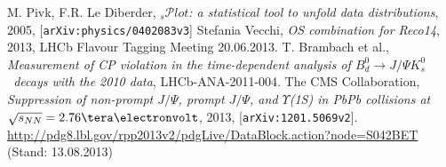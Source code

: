 \documentclass[ a4paper,
                12pt, 
                twoside, 
                chapterprefix,                
              ]{scrreprt}
\newcommand{\Decaychannel}{$B_d^0 \rightarrow J/\Psi K_s^0$}
\newcommand{\SPlot}{$_s\mathcal{P}lot$}
\begin{document}
\begin{thebibliography}{---}
 M. Pivk, F.R. Le Diberder, \SPlot\textit{: a statistical tool to unfold data distributions}, 2005, [\texttt{arXiv:physics/0402083v3}]
 Stefania Vecchi, \textit{OS combination for Reco14}, 2013, LHCb Flavour Tagging Meeting 20.06.2013.
 T. Brambach et al., \textit{Measurement of CP violation in the time-dependent analysis of \Decaychannel\ decays with the 2010 data}, LHCb-ANA-2011-004.
 The CMS Collaboration, \textit{Suppression of non-prompt $J/\Psi$, prompt $J/\Psi$, and $\Upsilon$(1S)
in PbPb collisions at $\sqrt{s_{NN}} = 2.76 \tera\electronvolt$}, 2013, [\texttt{arXiv:1201.5069v2}].
 \url{http://pdg8.lbl.gov/rpp2013v2/pdgLive/DataBlock.action?node=S042BET} (Stand: 13.08.2013)
\end{thebibliography}


\end{document}
